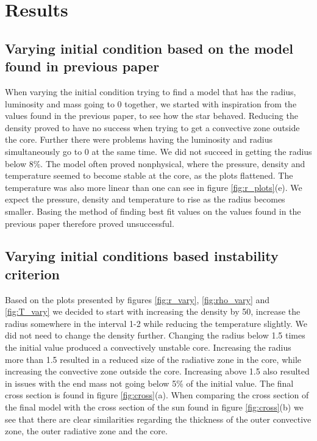 \documentclass[a4paper,10pt]{article}
\begin{document}
\section{Results}
\subsection{Varying initial condition based on the model found in previous paper}
When varying the initial condition trying to find a model that has the radius, luminosity and mass going to 0 together, we started with inspiration from the values found in the previous paper, to see how the star behaved. Reducing the density proved to have no success when trying to get a convective zone outside the core. Further there were problems having the luminosity and radius simultaneously go to 0 at the same time. We did not succeed in getting the radius below 8\%. The model often proved nonphysical, where the pressure, density and temperature seemed to become stable at the core, as the plots flattened. The temperature was also more linear than one can see in figure \ref{fig:r_plots}(e). We expect the pressure, density and temperature to rise as the radius becomes smaller. Basing the method of finding best fit values on the values found in the previous paper therefore proved unsuccessful.

\subsection{Varying initial conditions based instability criterion}
Based on the plots presented by figures \ref{fig:r_vary}, \ref{fig:rho_vary} and \ref{fig:T_vary} we decided to start with increasing the density by 50, increase the radius somewhere in the interval 1-2 while reducing the temperature slightly. We did not need to change the density further. Changing the radius below 1.5 times the initial value produced a convectively unstable core. Increasing the radius more than 1.5 resulted in a reduced size of the radiative zone in the core, while increasing the convective zone outside the core. Increasing above 1.5 also resulted in issues with the end mass not going below 5\% of the initial value. The final cross section is found in figure \ref{fig:cross}(a). When comparing the cross section of the final model with the cross section of the sun found in figure \ref{fig:cross}(b) we see that there are clear similarities regarding the thickness of the outer convective zone, the outer radiative zone and the core.
\end{document}
